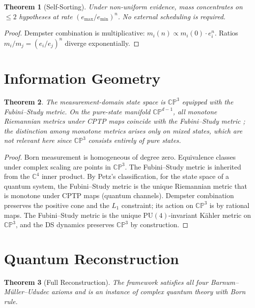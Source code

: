 \documentclass[11pt,a4paper]{article}
\newtheorem{theorem}{Theorem}[section]
\theoremstyle{definition}
\theoremstyle{remark}
\newcommand{\CP}{\mathbb{CP}}
\newcommand{\C}{\mathbb{C}}
\begin{document}
\begin{theorem}[Self-Sorting]\label{thm:selfsort}
Under non-uniform evidence, mass concentrates on $\leq 2$ hypotheses at rate $(e_{\max}/e_{\min})^n$. No external scheduling is required.
\end{theorem}

\begin{proof}
Dempster combination is multiplicative: $m_i(n)\propto m_i(0)\cdot e_i^n$. Ratios $m_i/m_j=(e_i/e_j)^n$ diverge exponentially.
\end{proof}


\section{Information Geometry}\label{sec:geometry}

\begin{theorem}\label{thm:fubini}
The measurement-domain state space is $\CP^3$ equipped with the Fubini--Study metric. On the pure-state manifold $\CP^{d-1}$, all monotone Riemannian metrics under CPTP maps coincide with the Fubini--Study metric \cite{Petz1996}; the distinction among monotone metrics arises only on mixed states, which are not relevant here since $\CP^3$ consists entirely of pure states.
\end{theorem}

\begin{proof}
Born measurement is homogeneous of degree zero. Equivalence classes under complex scaling are points in $\CP^3$. The Fubini--Study metric is inherited from the $\C^4$ inner product. By Petz's classification, for the state space of a quantum system, the Fubini--Study metric is the unique Riemannian metric that is monotone under CPTP maps (quantum channels). Dempster combination preserves the positive cone and the $L_1$ constraint; its action on $\CP^3$ is by rational maps. The Fubini--Study metric is the unique $\mathrm{PU}(4)$-invariant K\"ahler metric on $\CP^3$, and the DS dynamics preserves $\CP^3$ by construction.
\end{proof}


\section{Quantum Reconstruction}\label{sec:BMU}

\begin{theorem}[Full Reconstruction]\label{thm:BMU}
The framework satisfies all four Barnum--M\"uller--Ududec axioms and is an instance of complex quantum theory with Born rule.
\end{theorem}
\end{document}
